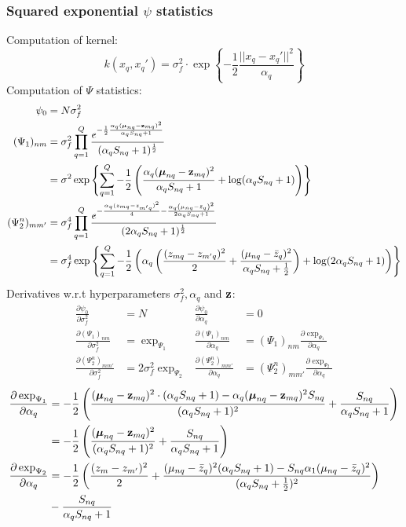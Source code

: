 \documentclass[11pt, a4paper]{article}
\begin{document}
\subsubsection{Squared exponential $\psi$ statistics}
\label{sec:SEpsi}
Computation of kernel:
\begin{equation}
  k(x_q,x_q') = \sigma^2_f \cdot \exp\left\{-\frac12\frac{||x_q - x_q'||^2}{\alpha_q}\right\}
\end{equation}
Computation of $\Psi$ statistics:
\begin{align*}
  \label{eq:psi_se}
  \psi_0 & = N\sigma_f^2\\
  (\Psi_1)_{nm} & = \sigma^2_f \prod_{q=1}^Q
  \frac{ e^{ - \frac{1}{2} \frac{ \alpha_q ({\boldsymbol{\mu}}_{nq}  -
        {\bf z}_{mq})^2}{\alpha_q S_{nq} + 1}}}
  {( \alpha_q S_{nq} + 1)^{\frac{1}{2}}} \\
  & = \sigma^2 \exp\left\{
    \sum_{q=1}^Q-\frac12 
    \left( \frac{\alpha_q({\boldsymbol{\mu}}_{nq} - {\bf z}_{mq})^2} {\alpha_qS_{nq}+1} 
      + \log(\alpha_qS_{nq}+1)
    \right)
  \right\}\\
  (\Psi^n_2)_{m m'} & = \sigma_f^4 
  \prod_{q=1}^Q \frac{ e^{-  \frac{\alpha_q (z_{mq} -
        z_{m'q})^2}{4} - \frac{\alpha_q \left(\mu_{nq} -
          \bar{z}_{q} \right)^2}{2 \alpha_q S_{nq} + 1}}}
  {(2 \alpha_q S_{nq} + 1)^{\frac{1}{2}}}\\
  & = \sigma_f^4\exp\left\{\sum_{q=1}^Q-\frac12\left(\alpha_q\left(\frac{(z_{mq}-z_{m'q})^2}2 + \frac{(\mu_{nq}-\bar z_q)^2}{\alpha_qS_{nq}+\frac12}\right) + \log(2\alpha_qS_{nq}+1)\right)\right\}
\end{align*}
Derivatives w.r.t hyperparameters $\sigma^2_f, \alpha_q$ and $\bf z$:
\begin{align*}
  \frac{\partial\psi_0}{\partial\sigma_f^2} & = N & \frac{\partial\psi_0}{\partial\alpha_q} & = 0\\
  \frac{\partial(\Psi_1)_{nm}}{\partial\sigma_f^2} & = \exp_{\Psi_1} 
  & \frac{\partial(\Psi_1)_{nm}}{\partial\alpha_q} & = (\Psi_1)_{nm}\frac{\partial\exp_{\Psi_1}}{\partial\alpha_q} \\
  \frac{\partial(\Psi_2^n)_{mm'}}{\partial\sigma_f^2} & = 2\sigma_f^2\exp_{\Psi_2} 
  & \frac{\partial(\Psi_2^n)_{mm'}}{\partial\alpha_q} & = (\Psi_2^n)_{mm'}\frac{\partial\exp_{\Psi_2}}{\partial\alpha_q} 
\end{align*}
\begin{align*}
    \frac{\partial\exp_{\Psi_1}}{\partial\alpha_q} &= -\frac12\left(\frac{(\boldsymbol{\mu}_{nq} - {\bf z}_{mq})^2\cdot(\alpha_qS_{nq}+1)-\alpha_q(\boldsymbol{\mu}_{nq} - {\bf z}_{mq})^2S_{nq}}{(\alpha_qS_{nq}+1)^2} + \frac{S_{nq}}{\alpha_qS_{nq}+1} \right)\\
    &= -\frac12\left(\frac{(\boldsymbol{\mu}_{nq} - {\bf z}_{mq})^2}{(\alpha_qS_{nq}+1)^2} + \frac{S_{nq}}{\alpha_qS_{nq}+1} \right)\\
  \frac{\partial\exp_{\Psi_2}}{\partial\alpha_q} &= -\frac12\left(\frac{(z_m-z_{m'})^2}2 + \frac{(\mu_{nq} - \bar z_q)^2(\alpha_qS_{nq}+1) - S_{nq}\alpha_1(\mu_{nq} - \bar z_q)^2}{(\alpha_qS_{nq}+\frac12)^2}\right)\\
  & - \frac{S_{nq}}{\alpha_qS_{nq}+1}
\end{align*}
\end{document}

